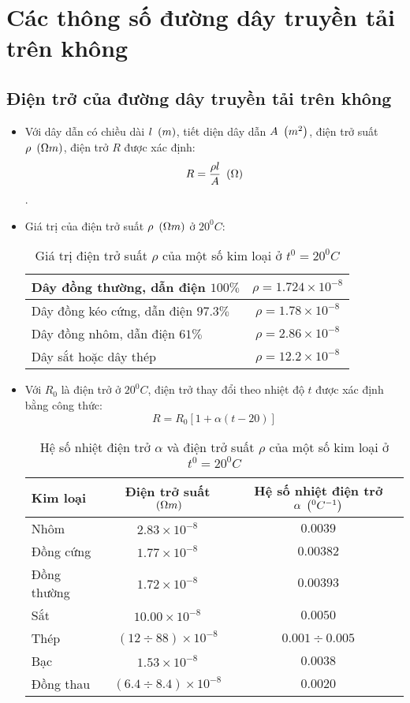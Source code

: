 \section{Các thông số đường dây truyền tải trên không}
\subsection{Điện trở của đường dây truyền tải trên không}
\begin{itemize}
\item Với dây dẫn có chiều dài $l ~\left({m}\right)$, tiết diện dây dẫn $A ~\left({m^2}\right)$, điện trở suất $\rho ~\left({\Omega m}\right)$, điện trở $R$ được xác định: $$ R = \dfrac{\rho l}{A} ~\left({\Omega}\right)$$.
\item Giá trị của điện trở suất $\rho ~\left({\Omega m}\right)$ ở $20^0C$:
\begin{table}[!h]
\begin{center}
\begin{tabular}{|l|c|}\hline
Dây đồng thường, dẫn điện $100\%$ & $\rho = 1.724 \times 10^{-8} $ \\ \hline
Dây đồng kéo cứng, dẫn điện $97.3\%$ & $\rho = 1.78 \times 10^{-8} $ \\  \hline
Dây đồng nhôm, dẫn điện $61\%$ & $\rho = 2.86 \times 10^{-8} $ \\ \hline
Dây sắt hoặc dây thép & $\rho = 12.2 \times 10^{-8} $ \\ \hline
\end{tabular}
\end{center}
\caption{Giá trị điện trở suất $\rho$ của một số kim loại ở $t^0 = 20^0C$} \label{Tab:gia-tri-dien-tro-suat}
\end{table}
\item  Với $R_0$ là điện trở ở $20^0C$, điện trở thay đổi theo nhiệt độ $t$ được xác định bằng công thức: $$R = R_0 \left[{1 + \alpha \left({t - 20}\right)}\right]$$
\begin{table}[!h]
\begin{center}
\begin{tabular}{|l|c|c|}\hline
Kim loại & Điện trở suất $~\left({\Omega m}\right)$ & Hệ số nhiệt điện trở $\alpha ~\left({^0C^{-1}}\right)$ \\ \hline
Nhôm & $2.83 \times 10^{-8}$ & $0.0039$ \\ \hline
Đồng cứng & $1.77 \times 10^{-8}$ & $0.00382$ \\ \hline
Đồng thường & $1.72 \times 10^{-8}$ & $0.00393$ \\ \hline
Sắt & $10.00 \times 10^{-8}$ & $0.0050$ \\ \hline
Thép & $(12 \div 88) \times 10^{-8}$ & $0.001 \div 0.005$ \\ \hline
Bạc & $1.53 \times 10^{-8}$ & $0.0038$ \\ \hline
Đồng thau & $(6.4 \div 8.4) \times 10^{-8}$ & $0.0020$ \\ \hline
\end{tabular}
\end{center}
\caption{Hệ số nhiệt điện trở $\alpha$ và điện trở suất $\rho$ của một số kim loại ở $t^0 = 20^0C$} \label{Tab:he-so-nhiet-dien-tro-gia-tri-dien-tro-suat}
\end{table}
\end{itemize}
\newpage

